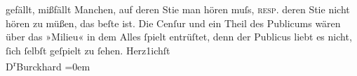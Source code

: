                     gefällt, mißfällt Manchen, auf deren Sti{\geminationm}e man
                    hören muſs, \textsc{resp.} deren Sti{\geminationm}e nicht hören zu müßen, das beſte ist. Die Cenſur
                    und ein Theil des Publicums wären über das »Milieu« in dem Alles ſpielt
                    entrüſtet, denn {\pb}der Publicus
                    liebt es nicht, ſich ſelbſt geſpielt zu ſehen.\pend
           \pstart
           Herz1ichſt{\\[\baselineskip]}\spacefill\mbox{D\textsuperscript{r}Burckhard}\pend
           \leftskip=0em{}\endnumbering{}  
      